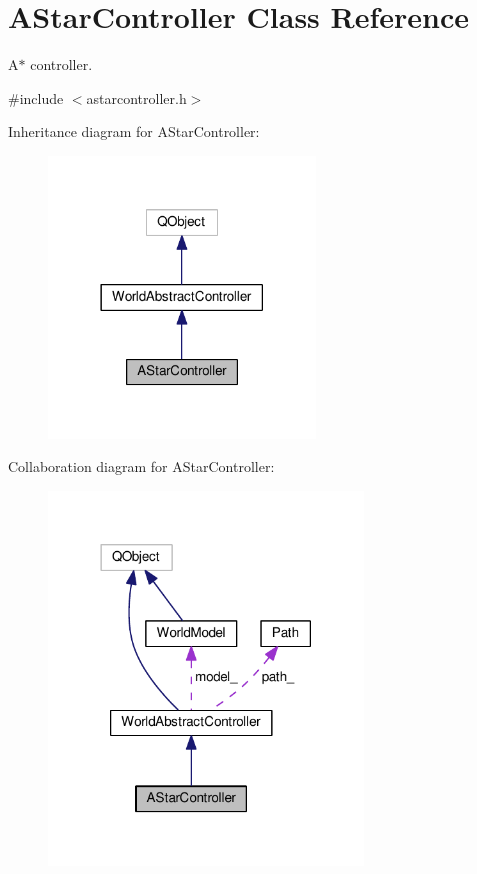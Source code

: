 \hypertarget{classAStarController}{}\section{A\+Star\+Controller Class Reference}
\label{classAStarController}


A$\ast$ controller.  




{\ttfamily \#include $<$astarcontroller.\+h$>$}



Inheritance diagram for A\+Star\+Controller\+:
\nopagebreak
\begin{figure}[H]
\begin{center}
\leavevmode
\includegraphics[width=201pt]{d5/dde/classAStarController__inherit__graph}
\end{center}
\end{figure}


Collaboration diagram for A\+Star\+Controller\+:
\nopagebreak
\begin{figure}[H]
\begin{center}
\leavevmode
\includegraphics[width=237pt]{d1/dda/classAStarController__coll__graph}
\end{center}
\end{figure}
